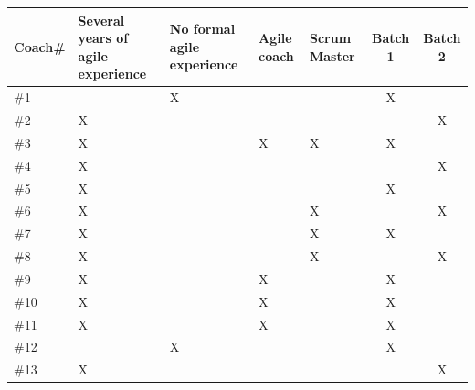 \documentclass[11pt,a4paper]{report}
\begin{document}
\begin{table}[!ht]
\begin{tabular}{|p{1.5cm}|p{3cm}|p{3cm}|p{2cm}|p{2.3cm}|c|c|}
\hline
\textbf{Coach\#}  & \textbf{Several years} of \textbf{agile experience} & \textbf{No formal agile experience} & \textbf{Agile coach} & \textbf{Scrum Master} & \textbf{Batch 1} & \textbf{Batch 2} \\ \hline
\centering\#1   &                            &    \centering      X                &             &     & \centering X &         \\\hline
\centering\#2   &       \centering X                    &                           &             &     && X        \\ \hline
\centering\#3   &       \centering  X                   &                           &    \centering  X       &    \centering  X     & \centering X &   \\\hline
\centering\#4   &       \centering    X                 &                           &             &   &&  X        \\\hline
\centering\#5   &     \centering       X                &                           &             &       &X&       \\\hline
\centering\#6   &     \centering        X               &                           &             &      \centering X  &&  X    \\\hline
\centering\#7   &     \centering       X                &                           &             &    \centering   X  &  X &     \\\hline
\centering\#8   &     \centering       X                &                           &             &     \centering  X   &&  X    \\\hline
\centering\#9   &      \centering      X                &                           &    \centering  X       &       & \centering X &       \\\hline
\centering\#10   &     \centering      X                 &                           &    \centering  X       &      & \centering X &        \\\hline
\centering\#11   &     \centering      X                 &                           &   \centering   X       &      & \centering X &        \\\hline
\centering\#12   &                            &        \centering     X              &             &      & \centering X &        \\\hline
\centering\#13   &     \centering       X                &                           &             &      && X        \\\hline

\end{tabular}
\end{table}
\end{document}

